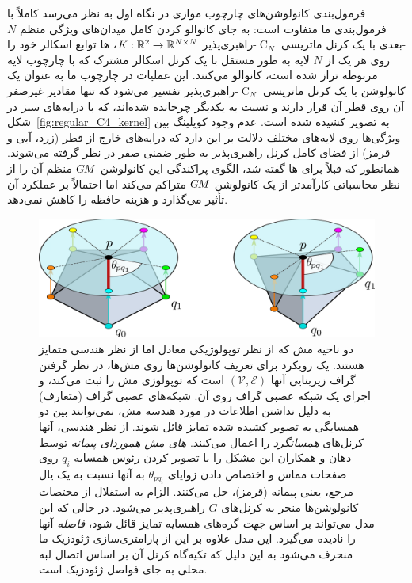 فرمول‌بندی کانولوشن‌های چارچوب موازی در نگاه اول به نظر می‌رسد کاملاً با فرمول‌بندی ما متفاوت است:
به جای کانوالو کردن کامل میدان‌های ویژگی منظم $N$-بعدی با یک کرنل ماتریسی $\operatorname{C}_N$-راهبری‌پذیر ${K: \mathbb{R}^2 \to \mathbb{R}^{N\times N}}$،
ها توابع اسکالر خود را روی هر یک از $N$ لایه به طور مستقل با یک کرنل اسکالر مشترک که با چارچوب لایه مربوطه تراز شده است، کانوالو می‌کنند.
این عملیات در چارچوب ما به عنوان یک کانولوشن با یک کرنل ماتریسی $\operatorname{C}_N$-راهبری‌پذیر تفسیر می‌شود که تنها مقادیر غیرصفر آن روی قطر آن قرار دارند و نسبت به یکدیگر چرخانده شده‌اند، که با درایه‌های سبز در شکل~\ref{fig:regular_C4_kernel} به تصویر کشیده شده است.
عدم وجود کوپلینگ بین ویژگی‌ها روی لایه‌های مختلف دلالت بر این دارد که درایه‌های خارج از قطر (زرد، آبی و قرمز) از فضای کامل کرنل راهبری‌پذیر به طور ضمنی صفر در نظر گرفته می‌شوند.
همانطور که قبلاً برای ها گفته شد، الگوی پراکندگی این کانولوشن $G\mkern-1.4muM$ منظم آن را از نظر محاسباتی کارآمدتر از یک کانولوشن $G\mkern-1.4muM$ متراکم می‌کند اما احتمالاً بر عملکرد آن تأثیر می‌گذارد و هزینه حافظه را کاهش نمی‌دهد.






\begin{figure}
    \centering
    \includegraphics[width=.7\columnwidth]{figures/mesh_CNN_neighborhood_geometry.pdf}
    \vspace*{1ex}
    \caption{\small
        دو ناحیه مش که از نظر توپولوژیکی معادل اما از نظر هندسی متمایز هستند.
        یک رویکرد برای تعریف کانولوشن‌ها روی مش‌ها، در نظر گرفتن گراف زیربنایی آنها $(\mathcal{V},\mathcal{E})$ است که توپولوژی مش را ثبت می‌کند، و اجرای یک شبکه عصبی گراف روی آن.
        شبکه‌های عصبی گراف (متعارف) به دلیل نداشتن اطلاعات در مورد هندسه مش، نمی‌توانند بین دو همسایگی به تصویر کشیده شده تمایز قائل شوند.
        از نظر هندسی، آنها کرنل‌های \emph{همسانگرد} را اعمال می‌کنند.
        \emph{های مش هموردای پیمانه} توسط دهان و همکاران\cite{deHaan2020meshCNNs} این مشکل را با تصویر کردن رئوس همسایه $q_i$ روی صفحات مماس و اختصاص دادن زوایای $\theta_{pq_i}$ به آنها نسبت به یک یال مرجع، یعنی پیمانه (قرمز)، حل می‌کنند.
        الزام به استقلال از مختصات کانولوشن‌ها منجر به کرنل‌های $G$-راهبری‌پذیر می‌شود.
        در حالی که این مدل می‌تواند بر اساس \emph{جهت} گره‌های همسایه تمایز قائل شود، \emph{فاصله} آنها را نادیده می‌گیرد.
        این مدل علاوه بر این از پارامتری‌سازی ژئودزیک ما منحرف می‌شود به این دلیل که تکیه‌گاه کرنل آن بر اساس اتصال لبه محلی به جای فواصل ژئودزیک است.
    }
    \label{fig:mesh_CNNs_neighborhood}
\end{figure}


